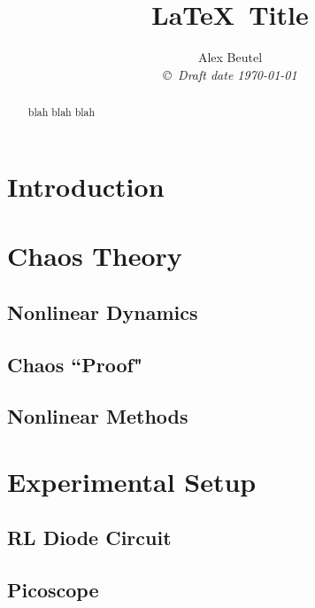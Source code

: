 \documentclass[12pt]{report}
\title{\LaTeX \ Title }
\author{Alex Beutel  \\
{\small\em \copyright \  Draft date \today }}
\date{ }
\begin{document}
\maketitle
\begin{abstract}
	blah blah blah
\end{abstract}
\tableofcontents
\listoffigures
\listoftables

\pagestyle{headings}

\pagestyle{plain}

\chapter{Introduction}



\chapter{Chaos Theory}

\section{Nonlinear Dynamics}
\label{sec: Nonlinear Dynamics}


\section{Chaos ``Proof"}
\label{sec: Chaos ``Proof"}


\section{Nonlinear Methods}
\label{sec: Nonlinear Methods}


\chapter{Experimental Setup}

\section{RL Diode Circuit}
\label{sec:RL Diode Circuit}


\section{Picoscope}
\label{sec:Picoscope}

\end{document}
